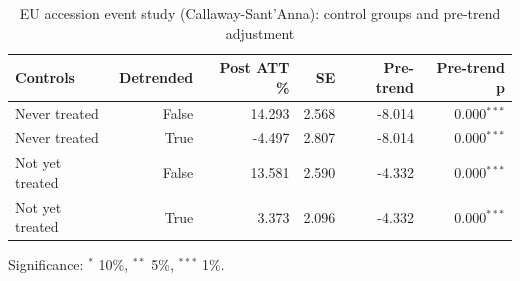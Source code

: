 \begin{table}[htbp]
\centering\small
\caption{EU accession event study (Callaway-Sant'Anna): control groups and pre-trend adjustment}
\label{tab:event}
\begin{tabular}{lrrrrr}
\toprule
Controls & Detrended & Post ATT \% & SE & Pre-trend & Pre-trend p \\
\midrule
Never treated & False & 14.293 & 2.568 & -8.014 & 0.000$^{***}$ \\
Never treated & True & -4.497 & 2.807 & -8.014 & 0.000$^{***}$ \\
Not yet treated & False & 13.581 & 2.590 & -4.332 & 0.000$^{***}$ \\
Not yet treated & True & 3.373 & 2.096 & -4.332 & 0.000$^{***}$ \\
\bottomrule
\end{tabular}
\par\footnotesize Significance: $^{*}$ 10\%, $^{**}$ 5\%, $^{***}$ 1\%.
\end{table}
